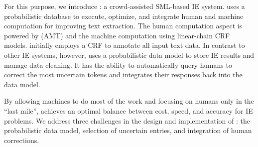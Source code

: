 



For this purpose, we introduce \sysName: a crowd-assisted SML-based IE system. \sysName uses a probabilistic database to execute, optimize, and integrate human and machine computation for improving text extraction.  The human computation aspect is powered by (AMT) and the machine computation using linear-chain CRF models.  \sysName initially employs a CRF to annotate all input text data. In contrast to other IE systems, however, \sysName uses a probabilistic data model to store IE results and manage data cleaning.  It has the ability to automatically query humans to correct the most uncertain tokens and integrates their responses back into the data model.

By allowing machines to do most of the work and focusing on humans only in the ``last mile'', \sysName achieves an optimal balance
between cost, speed, and accuracy for IE problems. We address three challenges in the design and implementation of \sysName: the probabilistic data model, selection of uncertain entries, and integration of human corrections.

